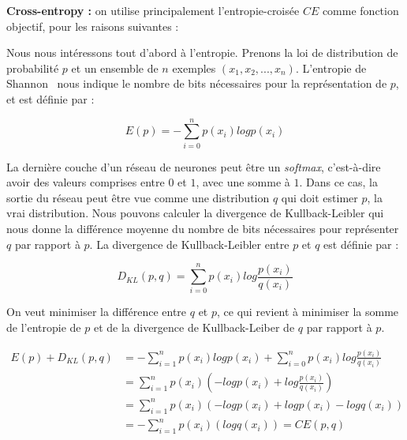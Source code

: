 \begin{oframed}

\textbf{Cross-entropy : }
on utilise principalement l'entropie-croisée $CE$ comme fonction objectif, pour les raisons suivantes : 


Nous nous intéressons tout d'abord à l'entropie.
Prenons la loi de distribution de probabilité $p$ et un ensemble de $n$ exemples $(x_1, x_2, ..., x_n)$.
L'entropie de Shannon~\cite{shannon2001mathematical} nous indique le nombre de bits nécessaires pour la représentation de $p$, et est définie par :

\begin{equation}
E(p) = -\sum_{i=0}^n p(x_i) log p(x_i)
\label{eq:entropie}
\end{equation}

La dernière couche d'un réseau de neurones peut être un \textit{softmax}, c'est-à-dire avoir des valeurs comprises entre $0$ et $1$, avec une somme à $1$.
Dans ce cas, la sortie du réseau peut être vue comme une distribution $q$ qui doit estimer $p$, la vrai distribution.
Nous pouvons calculer la divergence de Kullback-Leibler qui nous donne la différence moyenne du nombre de bits nécessaires pour représenter $q$ par rapport à $p$.
La divergence de Kullback-Leibler entre $p$ et $q$ est définie par :

\begin{equation}
D_{KL}(p,q) = \sum_{i=0}^n p(x_i) log \frac{p(x_i)}{q(x_i)}
\label{eq:dkl}
\end{equation}

On veut minimiser la différence entre $q$ et $p$, ce qui revient à minimiser la somme de l'entropie de $p$ et de la divergence de Kullback-Leiber de $q$ par rapport à $p$. 

\begin{align}
 E(p) + D_{KL}(p,q) &= -\sum_{i=1}^n p(x_i) log p(x_i) + \sum_{i=0}^n p(x_i) log \frac{p(x_i)}{q(x_i)} \label{eq:sum1} \\
										&= \sum_{i=1}^n p(x_i) \left ( -log p(x_i) + log \frac{p(x_i)}{q(x_i)} \right ) \label{eq:sum2} \\
										&= \sum_{i=1}^n p(x_i) \left ( -log p(x_i) + log p(x_i) - log q(x_i) \right ) \label{eq:sum3} \\
										&= - \sum_{i=1}^n p(x_i) \left ( log q(x_i) \right ) = CE(p,q) \label{eq:sum4}
\end{align}
 

\end{oframed}

